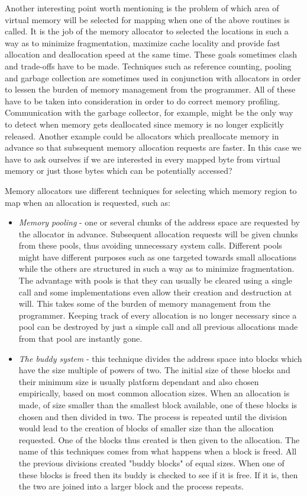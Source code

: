 Another interesting point worth mentioning is the problem of which area of virtual memory will be selected for mapping when one of the above routines is called. It is the job of the memory allocator to selected the locations in such a way as to minimize fragmentation, maximize cache locality and provide fast allocation and deallocation speed at the same time. These goals sometimes clash and trade-offs have to be made. Techniques such as reference counting, pooling and garbage collection are sometimes used in conjunction with allocators in order to lessen the burden of memory management from the programmer. All of these have to be taken into consideration in order to do correct memory profiling. Communication with the garbage collector, for example, might be the only way to detect when memory gets deallocated since memory is no longer explicitly released. Another example could be allocators which preallocate memory in advance so that subsequent memory allocation requests are faster. In this case we have to ask ourselves if we are interested in every mapped byte from virtual memory or just those bytes which can be potentially accessed?

Memory allocators use different techniques for selecting which memory region to map when an allocation is requested, such as:
\begin{itemize}
\item \textit{Memory pooling} - one or several chunks of the address space are requested by the allocator in advance. Subsequent allocation requests will be given chunks from these pools, thus avoiding unnecessary system calls. Different pools might have different purposes such as one targeted towards small allocations while the others are structured in such a way as to minimize fragmentation. The advantage with pools is that they can usually be cleared using a single call and some implementations even allow their creation and destruction at will. This takes some of the burden of memory management from the programmer. Keeping track of every allocation is no longer necessary since a pool can be destroyed by just a simple call and all previous allocations made from that pool are instantly gone.
\item \textit{The buddy system} - this technique divides the address space into blocks which have the size multiple of powers of two. The initial size of these blocks and their minimum size is usually platform dependant and also chosen empirically, based on most common allocation sizes. When an allocation is made, of size smaller than the smallest block available, one of these blocks is chosen and then divided in two. The process is repeated until the division would lead to the creation of blocks of smaller size than the allocation requested. One of the blocks thus created is then given to the allocation. The name of this techniques comes from what happens when a block is freed. All the previous divisions created "buddy blocks" of equal sizes. When one of these blocks is freed then its buddy is checked to see if it is free. If it is, then the two are joined into a larger block and the process repeats.
\end{itemize}

